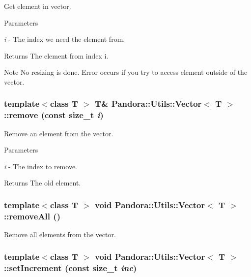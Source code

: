 Get element in vector. 
\begin{DoxyParams}{Parameters}
\item[{\em i}]-\/ The index we need the element from. \end{DoxyParams}
\begin{DoxyReturn}{Returns}
The element from index i. 
\end{DoxyReturn}
\begin{DoxyNote}{Note}
No resizing is done. Error occurs if you try to access element outside of the vector. 
\end{DoxyNote}
\hypertarget{classPandora_1_1Utils_1_1Vector_a37cd40a897817d586431d390aaa1345b}{
\subsubsection[{remove}]{\setlength{\rightskip}{0pt plus 5cm}template$<$class T $>$ T\& {\bf Pandora::Utils::Vector}$<$ T $>$::remove (const size\_\-t {\em i})}}
\label{classPandora_1_1Utils_1_1Vector_a37cd40a897817d586431d390aaa1345b}


Remove an element from the vector. 
\begin{DoxyParams}{Parameters}
\item[{\em i}]-\/ The index to remove. \end{DoxyParams}
\begin{DoxyReturn}{Returns}
The old element. 
\end{DoxyReturn}
\hypertarget{classPandora_1_1Utils_1_1Vector_ab9f631b7ca468cba7f358ee14043b0a6}{
\subsubsection[{removeAll}]{\setlength{\rightskip}{0pt plus 5cm}template$<$class T $>$ void {\bf Pandora::Utils::Vector}$<$ T $>$::removeAll ()}}
\label{classPandora_1_1Utils_1_1Vector_ab9f631b7ca468cba7f358ee14043b0a6}


Remove all elements from the vector. \hypertarget{classPandora_1_1Utils_1_1Vector_a7712e06b6660e77796a6d4093d949e8e}{
\subsubsection[{setIncrement}]{\setlength{\rightskip}{0pt plus 5cm}template$<$class T $>$ void {\bf Pandora::Utils::Vector}$<$ T $>$::setIncrement (const size\_\-t {\em inc})}}
\label{classPandora_1_1Utils_1_1Vector_a7712e06b6660e77796a6d4093d949e8e}


